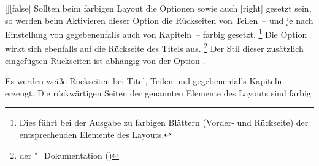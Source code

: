 \begin{Declaration}{[\PBoolean]}[false]%
\printdeclarationlist%
%
%
%
%
%
Sollten beim farbigen Layout die Optionen  sowie auch
[right] gesetzt sein, so werden beim Aktivieren dieser Option die 
Rückseiten von Teilen~-- und je nach Einstellung von  
gegebenenfalls auch von Kapiteln~-- farbig gesetzt.%
\footnote{%
  Dies führt bei der Ausgabe zu farbigen Blättern (Vorder- und Rückseite) der 
  entsprechenden Elemente des Layouts.
}
Die Option wirkt sich ebenfalls auf die Rückseite des Titels aus.%
\footnote{%
   der 
  \KOMAScript"=Dokumentation (\scrguide*)
}
Der Stil dieser zusätzlich eingefügten Rückseiten ist abhängig von der Option
.
%
\begin{values}
\itemfalse
  Es werden weiße Rückseiten bei Titel, Teilen und gegebenenfalls Kapiteln 
  erzeugt.
\itemtrue*
  Die rückwärtigen Seiten der genannten Elemente des Layouts sind farbig.
\end{values}
\end{Declaration}

